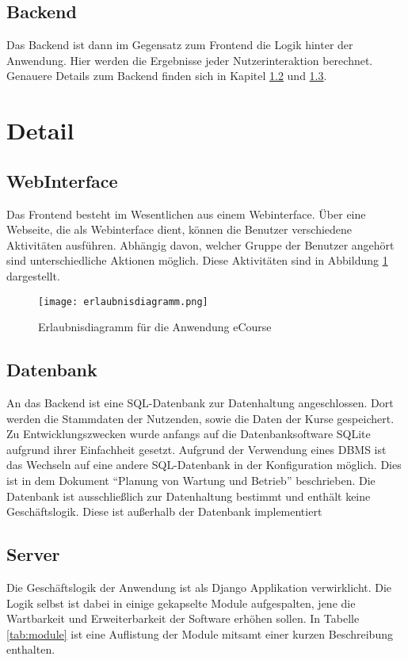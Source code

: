 \subsection{Backend}
Das \gls{Backend} ist dann im Gegensatz zum \gls{Frontend} die Logik hinter der Anwendung. Hier werden die Ergebnisse jeder Nutzerinteraktion berechnet. Genauere Details zum \gls{Backend} finden sich in Kapitel \ref{sec:Datenbank} und \ref{sec:Server}.

\section{Detail}

\subsection{WebInterface}
Das \gls{Frontend} besteht im Wesentlichen aus einem \gls{Webinterface}. Über eine Webseite, die als \gls{Webinterface} dient, können die Benutzer verschiedene Aktivitäten ausführen. Abhängig davon, welcher Gruppe der Benutzer angehört sind unterschiedliche Aktionen möglich. 
Diese Aktivitäten sind in Abbildung \ref{fib:erlaubnis} dargestellt.

\begin{figure}[H]
\centering
\texttt{[image: erlaubnisdiagramm.png]}
\caption{Erlaubnisdiagramm für die Anwendung eCourse}
\label{fib:erlaubnis}
\end{figure}

\subsection{Datenbank}
\label{sec:Datenbank}

An das Backend ist eine SQL-Datenbank zur Datenhaltung angeschlossen. Dort werden die Stammdaten der Nutzenden, sowie die Daten der Kurse gespeichert. Zu Entwicklungszwecken wurde anfangs auf die Datenbanksoftware \glqq SQLite\grqq\; aufgrund ihrer Einfachheit gesetzt. Aufgrund der Verwendung eines DBMS ist das Wechseln auf eine andere SQL-Datenbank in der Konfiguration möglich. Dies ist in dem Dokument \enquote{Planung von Wartung und Betrieb} beschrieben.
Die Datenbank ist ausschließlich zur Datenhaltung bestimmt und enthält keine Geschäftslogik. Diese ist außerhalb der Datenbank implementiert


\subsection{Server}
\label{sec:Server}
Die Geschäftslogik der Anwendung ist als Django Applikation verwirklicht. Die Logik selbst ist dabei in einige gekapselte Module aufgespalten, jene die Wartbarkeit und Erweiterbarkeit der Software erhöhen sollen. In Tabelle \ref{tab:module} ist eine Auflistung der Module mitsamt einer kurzen Beschreibung enthalten.



